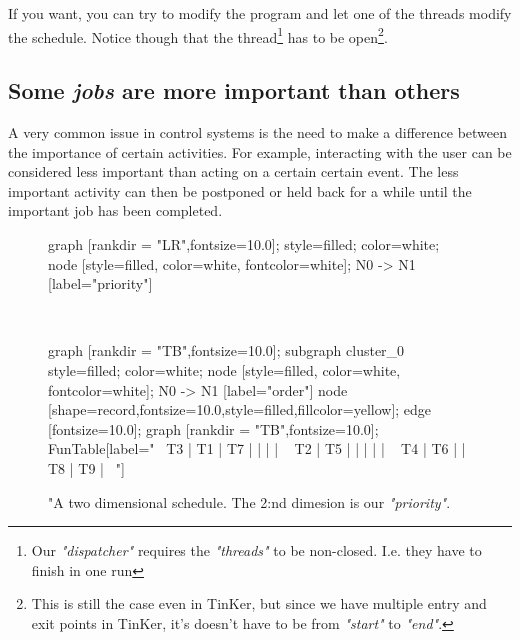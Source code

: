 	If you want, you can try to modify the program and let one of the threads modify the schedule. Notice though that the thread\footnote{Our \textit{"dispatcher"} requires the \textit{"threads"} to be non-closed. I.e. they have to finish in one run} has to be open\footnote{This is still the case even in TinKer, but since we have multiple entry and exit points in TinKer, it's doesn't have to be from \textit{"start"} to \textit{"end"}.}.

\subsection{Some \textit{jobs} are more important than others}
A very common issue in control systems is the need to make a difference between the importance of certain activities. For example, interacting with the user can be considered less important than acting on a certain certain event. The less important activity can then be postponed or held back for a while until the important job has been completed.
	
	\begin{figure}[!hbp]
	\begin{dotpic}
		graph [rankdir = "LR",fontsize=10.0];		
		style=filled;
		color=white;
		node [style=filled, color=white, fontcolor=white];
		N0 -> N1 [label="priority"]
	\end{dotpic}
\\
	\begin{dotpic}
		graph [rankdir = "TB",fontsize=10.0];
		subgraph cluster_0 {
			style=filled;
			color=white;
			node [style=filled, color=white, fontcolor=white];
			N0 -> N1 [label="order"]
		}
		node [shape=record,fontsize=10.0,style=filled,fillcolor=yellow];
		edge [fontsize=10.0];
		graph [rankdir = "TB",fontsize=10.0];
		FunTable[label="\
			{ T3    |   T1  |   T7  | \> |       |       } | \
			{ T2    |  T5   | \> |       |       |       } | \
			{ T4    |  T6   |       | T8    | T9    | \> } \
		"]
	
	\end{dotpic}
	\caption{"A two dimensional schedule. The 2:nd dimesion is our \textit{"priority"}.\label{FunTable3}}	
	\end{figure}


